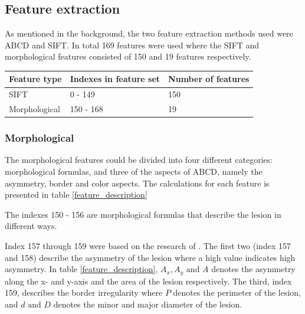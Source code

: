 \documentclass{kththesis}
\begin{document}
\subsection{Feature extraction}

As mentioned in the background, the two feature extraction methods used were ABCD and SIFT. In total 169 features were used where the SIFT and morphological features consisted of 150 and 19 features respectively.
\begin{table}[]
  \begin{tabular}{|l|l|l|}
  \hline
  Feature type  & Indexes in feature set & Number of features \\ \hline
  SIFT          & 0 - 149                & 150                \\ \hline
  Morphological & 150 - 168              & 19                 \\ \hline
  \end{tabular}
  \end{table}

  
  \subsubsection{Morphological} %
  
  The morphological features could be divided into four different categories: morphological formulas, and three of the aspects of ABCD, namely the asymmetry, border and color aspects.
  The calculations for each feature is presented in table \ref{feature_description}
  
  The indexes 150 - 156 are morphological formulas that describe the lesion in different ways. %

  
  Index 157 through 159 were based on the research of \parencite{inproceedings}. The first two (index 157 and 158) describe the asymmetry of the lesion where a high value indicates high asymmetry. In table \ref{feature_description}, \(A_x, A_y \textrm{ and } A\) denotes the asymmetry along the x- and y-axis and the area of the lesion respectively. The third, index 159, describes the border irregularity where \(P\) denotes the perimeter of the lesion, and \(d \textrm{ and } D\) denotes the minor and major diameter of the lesion.
\end{document}
